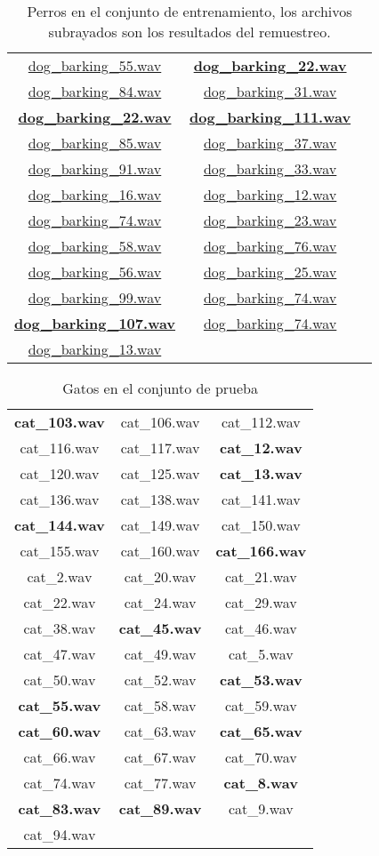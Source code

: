 \documentclass[twocolumn,10pt]{asme2ej}
\begin{document}
\begin{table}[h]
\begin{tabular}{ccc}
\underline{dog\_barking\_55.wav} & \textbf{\underline{dog\_barking\_22.wav}}\\
\underline{dog\_barking\_84.wav} & \underline{dog\_barking\_31.wav}\\
\textbf{\underline{dog\_barking\_22.wav}} & \textbf{\underline{dog\_barking\_111.wav}}\\
\underline{dog\_barking\_85.wav} & \underline{dog\_barking\_37.wav}\\
\underline{dog\_barking\_91.wav} & \underline{dog\_barking\_33.wav}\\
\underline{dog\_barking\_16.wav} & \underline{dog\_barking\_12.wav}\\
\underline{dog\_barking\_74.wav} & \underline{dog\_barking\_23.wav}\\
\underline{dog\_barking\_58.wav} & \underline{dog\_barking\_76.wav}\\
\underline{dog\_barking\_56.wav} & \underline{dog\_barking\_25.wav}\\
\underline{dog\_barking\_99.wav} & \underline{dog\_barking\_74.wav}\\
\textbf{\underline{dog\_barking\_107.wav}} & \underline{dog\_barking\_74.wav}\\
\underline{dog\_barking\_13.wav}
\end{tabular}
\label{tbl:conjunto_entre_perro}
\caption{Perros en el conjunto de entrenamiento, los archivos subrayados son los resultados del remuestreo.}
\end{table}
 \begin{table}[h]
\begin{tabular}{ccc}
\textbf{cat\_103.wav} & cat\_106.wav & cat\_112.wav\\
cat\_116.wav & cat\_117.wav & \textbf{cat\_12.wav}\\
cat\_120.wav & cat\_125.wav & \textbf{cat\_13.wav}\\
cat\_136.wav & cat\_138.wav & cat\_141.wav\\
\textbf{cat\_144.wav} & cat\_149.wav & cat\_150.wav\\
cat\_155.wav & cat\_160.wav & \textbf{cat\_166.wav}\\
cat\_2.wav & cat\_20.wav & cat\_21.wav\\
cat\_22.wav & cat\_24.wav & cat\_29.wav\\
cat\_38.wav & \textbf{cat\_45.wav} & cat\_46.wav\\
cat\_47.wav & cat\_49.wav & cat\_5.wav\\
cat\_50.wav & cat\_52.wav & \textbf{cat\_53.wav}\\
\textbf{cat\_55.wav} & cat\_58.wav & cat\_59.wav\\
\textbf{cat\_60.wav} & cat\_63.wav & \textbf{cat\_65.wav}\\
cat\_66.wav & cat\_67.wav & cat\_70.wav\\
cat\_74.wav & cat\_77.wav & \textbf{cat\_8.wav}\\
\textbf{cat\_83.wav} & \textbf{cat\_89.wav} & cat\_9.wav\\
cat\_94.wav
\end{tabular}
\label{tbl:conjunto_prueba_gato}
\caption{Gatos en el conjunto de prueba}
\end{table}
\end{document}

